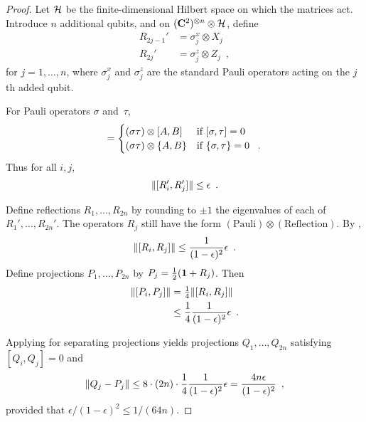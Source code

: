 \documentclass[preprintnumbers,11pt,onecolumn]{article}
\begin{document}
\begin{proof}
Let ${\mathcal H}$ be the finite-dimensional Hilbert space on which the matrices act.  Introduce $n$ additional qubits, and on $({\bf C}^2)^{\otimes n} \otimes {\mathcal H}$, define 
\begin{align*}
R_{2j-1}' &= \sigma_j^x \otimes X_j \\
R_{2j}' &= \sigma_j^z \otimes Z_j
 \enspace ,
\end{align*}
for $j = 1, \ldots, n$, where $\sigma_j^x$ and $\sigma_j^z$ are the standard Pauli operators acting on the $j$th added qubit.  

For Pauli operators $\sigma$ and~$\tau$, 
\begin{equation*}
[\sigma \otimes A, \tau \otimes B] =  \begin{cases} 
(\sigma \tau) \otimes [A, B] & \text{if $[\sigma, \tau] = 0$} \\
(\sigma \tau) \otimes \{A, B\} & \text{if $\{\sigma, \tau\} = 0$ \enspace .}
\end{cases}
\end{equation*}
Thus for all $i, j$, 
\begin{equation*}
{\| [R_i', R_j'] \|} \leq \epsilon
 \enspace .
\end{equation*}

Define reflections $R_1, \ldots, R_{2n}$ by rounding to $\pm 1$ the eigenvalues of each of $R_1', \ldots, R_{2n}'$.  The operators $R_j$ still have the form $(\text{Pauli}) \otimes (\text{Reflection})$.  By , 
\begin{equation*}
{\| [R_i, R_j] \|} \leq \frac{1}{(1 - \epsilon)^2} \epsilon
 \enspace .
\end{equation*}
Define projections $P_1, \ldots, P_{2n}$ by $P_j = \tfrac12 (\boldsymbol{1} + R_j)$.  Then 
\begin{equation*}\begin{split}
{\| [P_i, P_j] \|}
&= \tfrac14 {\| [R_i, R_j] \|} \\
&\leq \frac14 \frac{1}{(1-\epsilon)^2} \epsilon
 \enspace .
\end{split}\end{equation*}

Applying  for separating projections yields projections $Q_1, \ldots, Q_{2n}$ satisfying $[Q_i, Q_j] = 0$ and 
\begin{equation*}
{\| Q_j - P_j \|} \leq 8 \cdot (2n) \cdot \frac14 \frac{1}{(1-\epsilon)^2} \epsilon = \frac{4 n \epsilon}{(1 - \epsilon)^2}
 \enspace ,
\end{equation*}
provided that $\epsilon / (1-\epsilon)^2 \leq 1/(64n)$.  


\end{proof}
\end{document}
